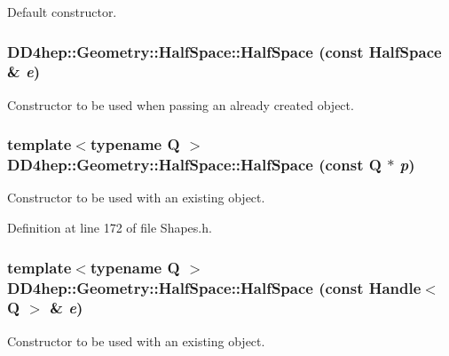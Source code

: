 Default constructor. \hypertarget{class_d_d4hep_1_1_geometry_1_1_half_space_a3d64ff92bd49078b1602609302bc57d3}{
\subsubsection[{HalfSpace}]{\setlength{\rightskip}{0pt plus 5cm}DD4hep::Geometry::HalfSpace::HalfSpace (const {\bf HalfSpace} \& {\em e})}}
\label{class_d_d4hep_1_1_geometry_1_1_half_space_a3d64ff92bd49078b1602609302bc57d3}


Constructor to be used when passing an already created object. \hypertarget{class_d_d4hep_1_1_geometry_1_1_half_space_acdea2ae740341bc458be29674de6df69}{
\subsubsection[{HalfSpace}]{\setlength{\rightskip}{0pt plus 5cm}template$<$typename Q $>$ DD4hep::Geometry::HalfSpace::HalfSpace (const Q $\ast$ {\em p})}}
\label{class_d_d4hep_1_1_geometry_1_1_half_space_acdea2ae740341bc458be29674de6df69}


Constructor to be used with an existing object. 

Definition at line 172 of file Shapes.h.\hypertarget{class_d_d4hep_1_1_geometry_1_1_half_space_a9c7fac6e8ec3c628acfeb46e4acd9ba4}{
\subsubsection[{HalfSpace}]{\setlength{\rightskip}{0pt plus 5cm}template$<$typename Q $>$ DD4hep::Geometry::HalfSpace::HalfSpace (const {\bf Handle}$<$ Q $>$ \& {\em e})}}
\label{class_d_d4hep_1_1_geometry_1_1_half_space_a9c7fac6e8ec3c628acfeb46e4acd9ba4}


Constructor to be used with an existing object. 

